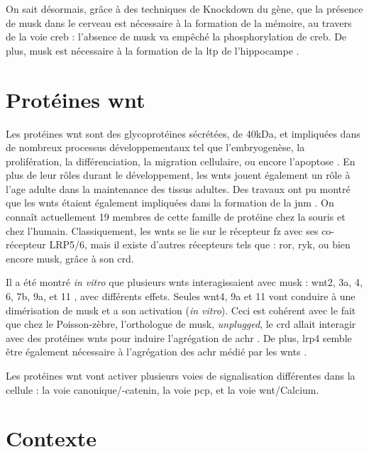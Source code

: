 	On sait désormais, grâce à des techniques de Knockdown du gène, que la présence de \gls{musk} dans le cerveau est nécessaire à la formation de la mémoire, au travers de la voie \acrshort{creb} : l'absence de \gls{musk} va empêché la phosphorylation de \gls{creb}. De plus, \gls{musk} est nécessaire à la formation de la \gls{ltp} de l'hippocampe \cite{Garcia-Osta2006}.
	
\section{Protéines \gls{wnt}}
	\label{sec:IntroWnt}
	
	Les protéines \gls{wnt} sont des glycoprotéines sécrétées, de 40kDa, et impliquées dans de nombreux processus développementaux tel que l'embryogenèse, la prolifération, la différenciation, la migration cellulaire, ou encore l'apoptose \cite{Miller2002, Willert2012a}. En plus de leur rôles durant le développement, les \Glspl{wnt} jouent également un rôle à l'age adulte dans la maintenance des tissus adultes. Des travaux ont pu montré que les \Glspl{wnt} étaient également impliquées dans la formation de la \gls{jnm} \cite{Hall2000}. On connaît actuellement 19 membres de cette famille de protéine chez la souris et chez l'humain. Classiquement, les \Glspl{wnt} se lie sur le récepteur \gls{fz} avec ses co-récepteur LRP5/6, mais il existe d'autres récepteurs tels que : \acrshort{ror}, \acrshort{ryk}, ou bien encore \gls{musk}, grâce à son \gls{crd}.
	
	Il a été montré \emph{in vitro} que plusieurs \Glspl{wnt} interagissaient avec \gls{musk} : \Gls{wnt}2, 3a, 4, 6, 7b, 9a, et 11 \cite{Strochlic2012, Zhang2012, Barik2014}, avec différents effets. Seules \gls{wnt}4, 9a et 11 vont conduire à une dimérisation de \gls{musk} et a son activation (\emph{in vitro}). Ceci est cohérent avec le fait que chez le Poisson-zèbre, l'orthologue de \gls{musk}, \emph{unplugged}, le \gls{crd} allait interagir avec des protéines \Glspl{wnt} pour induire l'agrégation de \gls{achr} \cite{Jing2009, Gordon2012}. De plus, \gls{lrp4} semble être également nécessaire à l'agrégation des \gls{achr} médié par les \gls{wnt}s \cite{Zhang2012}.
	
	Les protéines \gls{wnt} vont activer plusieurs voies de signalisation différentes dans la cellule :  la voie canonique/\textbeta-catenin, la voie \gls{pcp}, et la voie \gls{wnt}/Calcium. 

\section{Contexte}
	\label{sec:Contexte}
	

